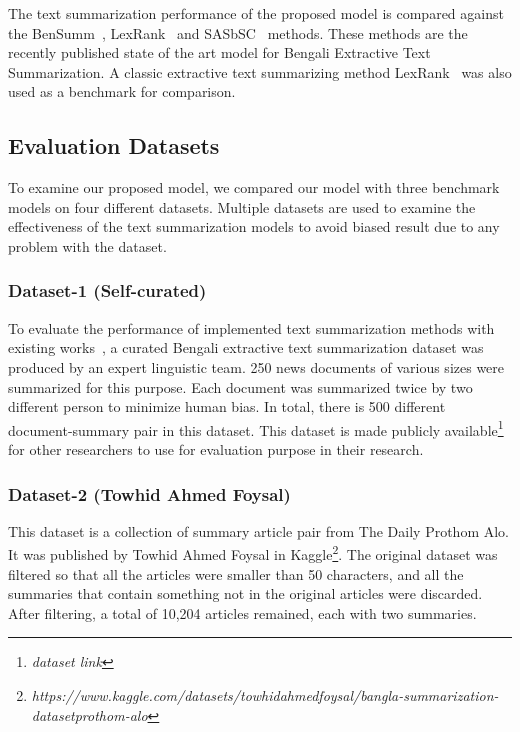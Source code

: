 The text summarization performance of the proposed model is compared against
the BenSumm~\cite{chowdhury-etal-2021-tfidf-clustering}, LexRank~\cite{Erkan-lexRank-2004} and
SASbSC~\cite{roychowdhury-etal-2022-spectral-base} methods.
These methods are the recently published state of the art model for Bengali Extractive Text Summarization.
A classic extractive text summarizing method LexRank~\cite{Erkan-lexRank-2004} was also used as a benchmark for comparison.

\subsection{Evaluation Datasets}\label{subsec:evaluation-datasets}
To examine our proposed model, we compared our model with three benchmark models on four different datasets.
Multiple datasets are used to examine the effectiveness of the text summarization
models to avoid biased result due to any problem with the dataset.

\subsubsection{Dataset-1 (Self-curated)}
To evaluate the performance of implemented text summarization
methods with existing works~\cite{chowdhury-etal-2021-tfidf-clustering,Erkan-lexRank-2004,roychowdhury-etal-2022-spectral-base},
a curated Bengali extractive text summarization dataset was produced by an expert linguistic team.
250 news documents of various sizes were summarized for this purpose.
Each document was summarized twice by two different person to minimize human bias.
In total, there is 500 different document-summary pair in this dataset.
This dataset is made publicly available\footnote{\textit{dataset link}} for other researchers to use for evaluation
purpose in their research.

\subsubsection{Dataset-2 (Towhid Ahmed Foysal)\cite{ahmed_2023_TAF_dataset}}
This dataset is a collection of summary article pair from The Daily Prothom Alo.
It was published by Towhid Ahmed Foysal in
Kaggle\footnote{\textit{https://www.kaggle.com/datasets/towhidahmedfoysal/bangla-summarization-datasetprothom-alo}}.
The original dataset was filtered so that all the articles were smaller than 50 characters, and all the summaries
that contain something not in the original articles were discarded.
After filtering, a total of 10,204 articles remained, each with two summaries.

